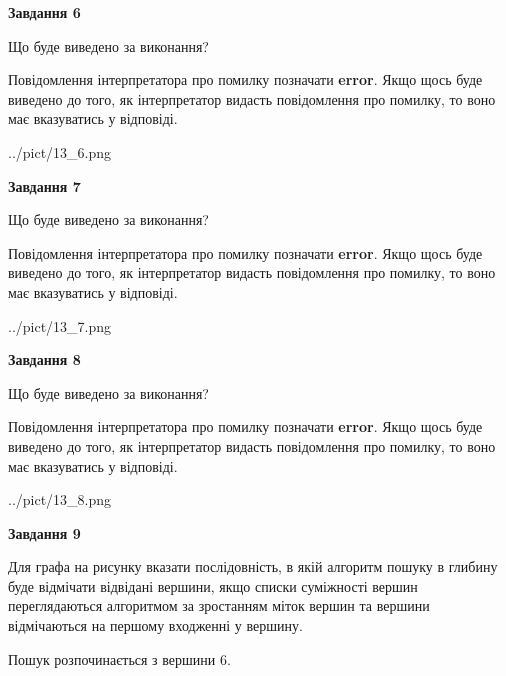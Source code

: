 \documentclass[12pt, ukrainian]{article}
\begin{document}
{\begin {large}
{\begin {center}\textbf{Завдання 6}\end {center}}\par
Що буде виведено за виконання?

Повідомлення інтерпретатора про помилку позначати \textbf{error}.
Якщо щось буде виведено до того, як інтерпретатор видасть повідомлення про помилку, 
то воно має вказуватись у відповіді. \par


\begin{center}
	{../pict/13_6.png}
\end{center}
\newpage

{\begin {center}\textbf{Завдання 7}\end {center}}\par
Що буде виведено за виконання?

Повідомлення інтерпретатора про помилку позначати \textbf{error}.
Якщо щось буде виведено до того, як інтерпретатор видасть повідомлення про помилку, 
то воно має вказуватись у відповіді. \par


\begin{center}
	{../pict/13_7.png}
\end{center}
\newpage

{\begin {center}\textbf{Завдання 8}\end {center}}\par
Що буде виведено за виконання?

Повідомлення інтерпретатора про помилку позначати \textbf{error}.
Якщо щось буде виведено до того, як інтерпретатор видасть повідомлення про помилку, 
то воно має вказуватись у відповіді. \par


\begin{center}
	{../pict/13_8.png}
\end{center}
\newpage

{\begin {center}\textbf{Завдання 9}\end {center}}\par
Для графа на рисунку вказати послідовність, в якій алгоритм пошуку в глибину буде відмічати відвідані вершини, якщо списки суміжності вершин переглядаються алгоритмом за зростанням міток вершин та вершини відмічаються на першому вход\-женні у вершину.\par
Пошук розпочинається з вершини 6.\par


\end{large}}
\end{document}
